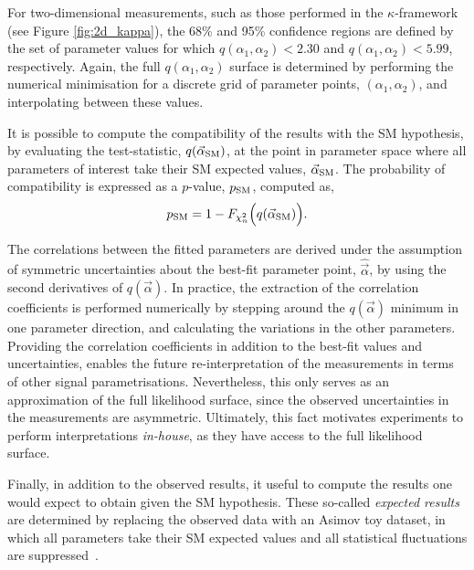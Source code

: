 For two-dimensional measurements, such as those performed in the $\kappa$-framework (see Figure \ref{fig:2d_kappa}), the 68\% and 95\% confidence regions are defined by the set of parameter values for which $q(\alpha_1,\alpha_2)<2.30$ and $q(\alpha_1,\alpha_2)<5.99$, respectively. Again, the full $q(\alpha_1,\alpha_2)$ surface is determined by performing the numerical minimisation for a discrete grid of parameter points, $(\alpha_1,\alpha_2)$, and interpolating between these values.

It is possible to compute the compatibility of the results with the SM hypothesis, by evaluating the test-statistic, $q(\vec{\alpha}_{\rm{SM}})$, at the point in parameter space where all parameters of interest take their SM expected values, $\vec{\alpha}_{\rm{SM}}$. The probability of compatibility is expressed as a $p$-value, $p_{\rm{SM}}$, computed as,
\begin{equation}
    p_{\rm{SM}} = 1-F_{\chi^2_n}\Big(q(\vec{\alpha}_{\rm{SM}})\Big).
\end{equation}

The correlations between the fitted parameters are derived under the assumption of symmetric uncertainties about the best-fit parameter point, $\hat{\vec{\alpha}}$, by using the second derivatives of $q(\vec{\alpha})$. In practice, the extraction of the correlation coefficients is performed numerically by stepping around the $q(\vec{\alpha})$ minimum in one parameter direction, and calculating the variations in the other parameters. Providing the correlation coefficients in addition to the best-fit values and uncertainties, enables the future re-interpretation of the measurements in terms of other signal parametrisations. Nevertheless, this only serves as an approximation of the full likelihood surface, since the observed uncertainties in the measurements are asymmetric. Ultimately, this fact motivates experiments to perform interpretations \textit{in-house}, as they have access to the full likelihood surface.

Finally, in addition to the observed results, it useful to compute the results one would expect to obtain given the SM hypothesis. These so-called \textit{expected results} are determined by replacing the observed data with an Asimov toy dataset, in which all parameters take their SM expected values and all statistical fluctuations are suppressed~\cite{Cowan:2010js}.



